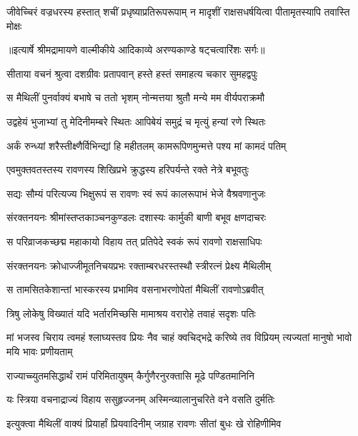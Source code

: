 \fourlineindentedshloka
{जीवेच्चिरं वज्रधरस्य हस्तात्}
{शचीं प्रधृष्याप्रतिरूपरूपाम्}
{न मादृशीं राक्षसधर्षयित्वा}
{पीतामृतस्यापि तवास्ति मोक्षः} %


{॥इत्यार्षे श्रीमद्रामायणे वाल्मीकीये आदिकाव्ये अरण्यकाण्डे षट्चत्वारिंशः सर्गः॥}


\twolineshloka
{सीताया वचनं श्रुत्वा दशग्रीवः प्रतापवान्}
{हस्ते हस्तं समाहत्य चकार सुमहद्वपुः} %

\twolineshloka
{स मैथिलीं पुनर्वाक्यं बभाषे च ततो भृशम्}
{नोन्मत्तया श्रुतौ मन्ये मम वीर्यपराक्रमौ} %

\twolineshloka
{उद्वहेयं भुजाभ्यां तु मेदिनीमम्बरे स्थितः}
{आपिबेयं समुद्रं च मृत्युं हन्यां रणे स्थितः} %

\twolineshloka
{अर्कं रुन्ध्यां शरैस्तीक्ष्णैर्विभिन्द्यां हि महीतलम्}
{कामरूपिणमुन्मत्ते पश्य मां कामदं पतिम्} %

\twolineshloka
{एवमुक्तवतस्तस्य रावणस्य शिखिप्रभे}
{क्रुद्धस्य हरिपर्यन्ते रक्ते नेत्रे बभूवतुः} %

\twolineshloka
{सद्यः सौम्यं परित्यज्य भिक्षुरूपं स रावणः}
{स्वं रूपं कालरूपाभं भेजे वैश्रवणानुजः} %

\twolineshloka
{संरक्तनयनः श्रीमांस्तप्तकाञ्चनकुण्डलः}
{दशास्यः कार्मुकी बाणी बभूव क्षणदाचरः} %

\twolineshloka
{स परिव्राजकच्छद्म महाकायो विहाय तत्}
{प्रतिपेदे स्वकं रूपं रावणो राक्षसाधिपः} %

\twolineshloka
{संरक्तनयनः क्रोधाज्जीमूतनिचयप्रभः}
{रक्ताम्बरधरस्तस्थौ स्त्रीरत्नं प्रेक्ष्य मैथिलीम्} %

\twolineshloka
{स तामसितकेशान्तां भास्करस्य प्रभामिव}
{वसनाभरणोपेतां मैथिलीं रावणोऽब्रवीत्} %

\twolineshloka
{त्रिषु लोकेषु विख्यातं यदि भर्तारमिच्छसि}
{मामाश्रय वरारोहे तवाहं सदृशः पतिः} %

\threelineshloka
{मां भजस्व चिराय त्वमहं श्लाघ्यस्तव प्रियः}
{नैव चाहं क्वचिद्भद्रे करिष्ये तव विप्रियम्}
{त्यज्यतां मानुषो भावो मयि भावः प्रणीयताम्} %

\twolineshloka
{राज्याच्च्युतमसिद्धार्थं रामं परिमितायुषम्}
{कैर्गुणैरनुरक्तासि मूढे पण्डितमानिनि} %

\twolineshloka
{यः स्त्रिया वचनाद्राज्यं विहाय ससुहृज्जनम्}
{अस्मिन्व्यालानुचरिते वने वसति दुर्मतिः} %

\twolineshloka
{इत्युक्त्वा मैथिलीं वाक्यं प्रियार्हां प्रियवादिनीम्}
{जग्राह रावणः सीतां बुधः खे रोहिणीमिव} %

